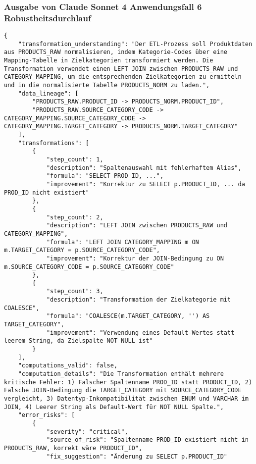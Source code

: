 \subsubsection{Ausgabe von Claude Sonnet 4 Anwendungsfall 6 Robustheitsdurchlauf}\label{anhang:subsubsec:claude_case6_prompt3}
\begin{lstlisting}[caption={Ausgabe: Claude Sonnet 4 Anwendungsfall 6 Robustheitsdurchlauf},label={claude_case6_prompt3}]
{
    "transformation_understanding": "Der ETL-Prozess soll Produktdaten aus PRODUCTS_RAW normalisieren, indem Kategorie-Codes über eine Mapping-Tabelle in Zielkategorien transformiert werden. Die Transformation verwendet einen LEFT JOIN zwischen PRODUCTS_RAW und CATEGORY_MAPPING, um die entsprechenden Zielkategorien zu ermitteln und in die normalisierte Tabelle PRODUCTS_NORM zu laden.",
    "data_lineage": [
        "PRODUCTS_RAW.PRODUCT_ID -> PRODUCTS_NORM.PRODUCT_ID",
        "PRODUCTS_RAW.SOURCE_CATEGORY_CODE -> CATEGORY_MAPPING.SOURCE_CATEGORY_CODE -> CATEGORY_MAPPING.TARGET_CATEGORY -> PRODUCTS_NORM.TARGET_CATEGORY"
    ],
    "transformations": [
        {
            "step_count": 1,
            "description": "Spaltenauswahl mit fehlerhaftem Alias",
            "formula": "SELECT PROD_ID, ...",
            "improvement": "Korrektur zu SELECT p.PRODUCT_ID, ... da PROD_ID nicht existiert"
        },
        {
            "step_count": 2,
            "description": "LEFT JOIN zwischen PRODUCTS_RAW und CATEGORY_MAPPING",
            "formula": "LEFT JOIN CATEGORY_MAPPING m ON m.TARGET_CATEGORY = p.SOURCE_CATEGORY_CODE",
            "improvement": "Korrektur der JOIN-Bedingung zu ON m.SOURCE_CATEGORY_CODE = p.SOURCE_CATEGORY_CODE"
        },
        {
            "step_count": 3,
            "description": "Transformation der Zielkategorie mit COALESCE",
            "formula": "COALESCE(m.TARGET_CATEGORY, '') AS TARGET_CATEGORY",
            "improvement": "Verwendung eines Default-Wertes statt leerem String, da Zielspalte NOT NULL ist"
        }
    ],
    "computations_valid": false,
    "computation_details": "Die Transformation enthält mehrere kritische Fehler: 1) Falscher Spaltenname PROD_ID statt PRODUCT_ID, 2) Falsche JOIN-Bedingung die TARGET_CATEGORY mit SOURCE_CATEGORY_CODE vergleicht, 3) Datentyp-Inkompatibilität zwischen ENUM und VARCHAR im JOIN, 4) Leerer String als Default-Wert für NOT NULL Spalte.",
    "error_risks": [
        {
            "severity": "critical",
            "source_of_risk": "Spaltenname PROD_ID existiert nicht in PRODUCTS_RAW, korrekt wäre PRODUCT_ID",
            "fix_suggestion": "Änderung zu SELECT p.PRODUCT_ID"

\end{lstlisting}
